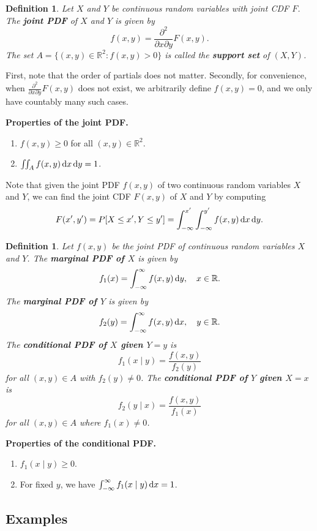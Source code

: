 \documentclass[10pt]{article}
\newcommand{\R}{\mathbb{R}}
\theoremstyle{newstyle}
\newtheorem{defn}[thm]{Definition}
\begin{document}
\begin{defn}
Let $X$ and $Y$ be continuous random variables with joint CDF $F$. The {\bf joint PDF} of 
$X$ and $Y$ is given by 
\[ f(x, y) = \frac{\partial^2}{\partial x \partial y} F(x, y). \]
The set $A = \{(x, y) \in \R^2 : f(x, y) > 0\}$ is called the {\bf support set} of $(X, Y)$.
\end{defn}

First, note that the order of partials does not matter. Secondly, for convenience, 
when $\frac{\partial^2}{\partial x \partial y} F(x, y)$ does not exist, we arbitrarily 
define $f(x, y) = 0$, and we only have countably many such cases.

{\bf Properties of the joint PDF.} 
\begin{enumerate}[(1)]
    \item $f(x, y) \geq 0$ for all $(x, y) \in \R^2$.
    \item $\iint_A f(x, y) \,{\rm d}x \,{\rm d}y = 1$.
\end{enumerate}
Note that given the joint PDF $f(x, y)$ of two continuous random variables $X$ and $Y$, 
we can find the joint CDF $F(x, y)$ of $X$ and $Y$ by computing 
\[ F(x', y') = P[X \leq x', Y \leq y'] = \int_{-\infty}^{x'} \int_{-\infty}^{y'} f(x, y)\,{\rm d}x
\,{\rm d}y. \]

\begin{defn}
Let $f(x, y)$ be the joint PDF of continuous random variables $X$ and $Y$. The {\bf marginal 
PDF of $X$} is given by 
\[ f_1(x) = \int_{-\infty}^\infty f(x, y) \, {\rm d}y, \quad x \in \R. \] 
The {\bf marginal PDF of $Y$} is given by 
\[ f_2(y) = \int_{-\infty}^\infty f(x, y)\,{\rm d}x, \quad y \in \R. \]
The {\bf conditional PDF of $X$ given $Y = y$} is 
\[ f_1(x \mid y) = \frac{f(x, y)}{f_2(y)} \]
for all $(x, y) \in A$ with $f_2(y) \neq 0$. The {\bf conditional PDF of $Y$ given $X=x$} is 
\[ f_2(y \mid x) = \frac{f(x, y)}{f_1(x)} \]
for all $(x, y) \in A$ where $f_1(x) \neq 0$. 
\end{defn}

{\bf Properties of the conditional PDF.} 
\begin{enumerate}[(1)]
    \item $f_1(x \mid y) \geq 0$. 
    \item For fixed $y$, we have $\int_{-\infty}^\infty f_1(x \mid y)\,{\rm d}x = 1$.
\end{enumerate}

\subsection{Examples}
\end{document}
